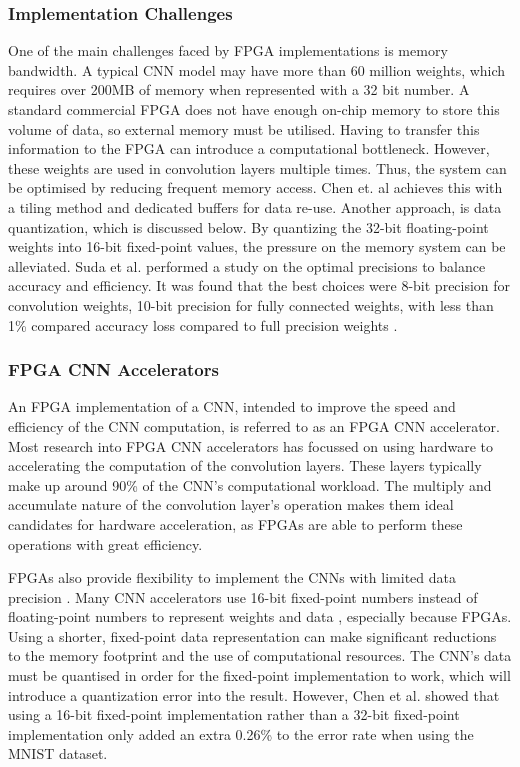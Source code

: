 \documentclass[12pt]{article}
\begin{document}
\subsubsection{Implementation Challenges}
\label{sec:Background-FpgaCnnImpl-Challenges}


One of the main challenges faced by FPGA implementations is memory bandwidth. A typical CNN model may have more than 60 million weights, which requires over 200MB of memory when represented with a 32 bit number. A standard commercial FPGA does not have enough on-chip memory to store this volume of data, so external memory must be utilised. Having to transfer this information to the FPGA can introduce a computational bottleneck. However, these weights are used in convolution layers multiple times. Thus, the system can be optimised by reducing frequent memory access. Chen et. al achieves this with a tiling method and dedicated buffers for data re-use. Another approach, is data quantization, which is discussed below. By quantizing the 32-bit floating-point weights into 16-bit fixed-point values, the pressure on the memory system can be alleviated. Suda et al. performed a study on the optimal precisions to balance accuracy and efficiency. It was found that the best choices were 8-bit precision for convolution weights, 10-bit precision for fully connected weights, with less than 1\% compared accuracy loss compared to full precision weights \cite{SudaFpgaAccelerator}.

\subsubsection{FPGA CNN Accelerators}
\label{sec:Background-FpgaCnnImpl-Accel}


An FPGA implementation of a CNN, intended to improve the speed and efficiency of the CNN computation, is referred to as an FPGA CNN accelerator. Most research into FPGA CNN accelerators has focussed on using hardware to accelerating the computation of the convolution layers. These layers typically make up around 90\% of the CNN's computational workload. The multiply and accumulate nature of the convolution layer's operation makes them ideal candidates for hardware acceleration, as FPGAs are able to perform these operations with great efficiency. 

FPGAs also provide flexibility to implement the CNNs with limited data precision \cite{SudaFpgaAccelerator}. Many CNN accelerators use 16-bit fixed-point numbers instead of floating-point numbers to represent weights and data \cite{ZhangFpgaAccelerator}\cite{ChenFpgaAccelerator}\cite{FarabetFpgaAccelerator}, especially because FPGAs. Using a shorter, fixed-point data representation can make significant reductions to the memory footprint and the use of computational resources. The CNN's data must be quantised in order for the fixed-point implementation to work, which will introduce a quantization error into the result. However, Chen et al. showed that using a 16-bit fixed-point implementation rather than a 32-bit fixed-point implementation only added an extra 0.26\% to the error rate when using the MNIST dataset.
\end{document}
